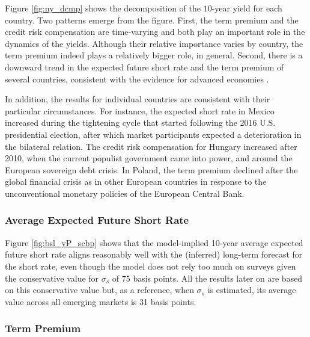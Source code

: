 {

Figure \ref{fig:ny_dcmp} shows the decomposition of the \(10\)-year yield for each country. Two patterns emerge from the figure. 
First, the term premium and the credit risk compensation are time-varying and both play an important role in the dynamics of the yields. 
Although their relative importance varies by country, the term premium indeed plays a relatively bigger role, in general. 
Second, there is a downward trend in the expected future short rate and the term premium of several countries, consistent with the evidence for advanced economies \citep{Wright:2011,ACDM:2019}.



In addition, the results for individual countries are consistent with their particular circumstances.
For instance, the expected short rate in Mexico increased during the tightening cycle that started following the 2016 U.S. presidential election, after which market participants expected a deterioration in the bilateral relation.
The credit risk compensation for Hungary increased after 2010, when the current populist government came into power, and around the European sovereign debt crisis. 
In Poland, the term premium declined after the global financial crisis as in other European countries in response to the unconventional monetary policies of the European Central Bank. 


\subsubsection{Average Expected Future Short Rate}
\iftoggle{toclinks}{\gototoc}{} %

Figure \ref{fig:bsl_yP_scbp} shows that the model-implied 10-year average expected future short rate aligns reasonably well with the (inferred) long-term forecast for the short rate, even though the model does not rely too much on surveys given the conservative value for \(\sigma_s\) of 75 basis points. 
All the results later on are based on this conservative value but, as a reference, when \(\sigma_s\) is estimated, its average value across all emerging markets is 31 basis points.




\subsubsection{Term Premium} \label{sec:TP}
\iftoggle{toclinks}{\gototoc}{} %

}
